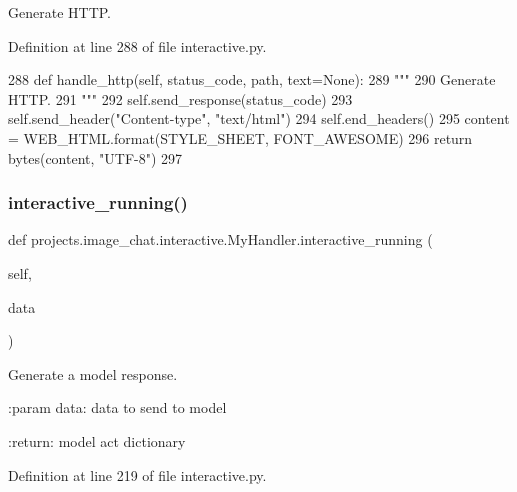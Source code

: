 \begin{DoxyVerb}Generate HTTP.
\end{DoxyVerb}
 

Definition at line 288 of file interactive.\+py.


\begin{DoxyCode}
288     \textcolor{keyword}{def }handle\_http(self, status\_code, path, text=None):
289         \textcolor{stringliteral}{"""}
290 \textcolor{stringliteral}{        Generate HTTP.}
291 \textcolor{stringliteral}{        """}
292         self.send\_response(status\_code)
293         self.send\_header(\textcolor{stringliteral}{"Content-type"}, \textcolor{stringliteral}{"text/html"})
294         self.end\_headers()
295         content = WEB\_HTML.format(STYLE\_SHEET, FONT\_AWESOME)
296         \textcolor{keywordflow}{return} bytes(content, \textcolor{stringliteral}{"UTF-8"})
297 
\end{DoxyCode}
\mbox{\label{classprojects_1_1image__chat_1_1interactive_1_1MyHandler_a6db12cd5204d5f4469f8570c7c38d007}} 
\subsubsection{\texorpdfstring{interactive\+\_\+running()}{interactive\_running()}}
{\footnotesize\ttfamily def projects.\+image\+\_\+chat.\+interactive.\+My\+Handler.\+interactive\+\_\+running (\begin{DoxyParamCaption}\item[{}]{self,  }\item[{}]{data }\end{DoxyParamCaption})}

\begin{DoxyVerb}Generate a model response.

:param data:
    data to send to model

:return:
    model act dictionary
\end{DoxyVerb}
 

Definition at line 219 of file interactive.\+py.



